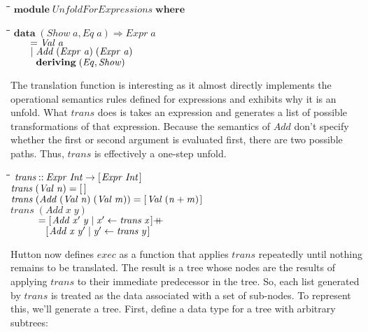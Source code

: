 \documentclass[10pt]{article}
\newlength{\lwidth}\setlength{\lwidth}{4.5cm}
\newlength{\cwidth}\setlength{\cwidth}{8mm} %
\newcommand{\Conid}[1]{\mathit{#1}}
\newcommand{\Varid}[1]{\mathit{#1}}
\newcommand{\plus}{\mathbin{+\!\!\!+}}
\begin{document}
\begin{tabbing}
\qquad\=\hspace{\lwidth}\=\hspace{\cwidth}\=\+\kill
${\mathbf{module}\;\Conid{UnfoldForExpressions}\;\mathbf{where}}$
\end{tabbing}
\begin{tabbing}
\qquad\=\hspace{\lwidth}\=\hspace{\cwidth}\=\+\kill
${\mathbf{data}\;(\Conid{Show}\;\Varid{a},\Conid{Eq}\;\Varid{a})\Rightarrow \Conid{Expr}\;\Varid{a}}$\\
${\hskip2.00em\relax\mathrel{=}\Conid{Val}\;\Varid{a}}$\\
${\hskip2.00em\relax\mid \Conid{Add}\;(\Conid{Expr}\;\Varid{a})\;(\Conid{Expr}\;\Varid{a})}$\\
${\hskip2.00em\relax\phantom{\mid \mbox{}}\mathbf{deriving}\;(\Conid{Eq},\Conid{Show})}$
\end{tabbing}
The translation function is interesting as it almost directly
implements the operational semantics rules defined for expressions and
exhibits why it is an unfold.  What \ensuremath{\Varid{trans}} does is takes an
expression and generates a list of possible transformations of that
expression.  Because the semantics of \ensuremath{\Conid{Add}} don't specify whether the
first or second argument is evaluated first, there are two possible
paths.  Thus, \ensuremath{\Varid{trans}} is effectively a one-step unfold.

\begin{tabbing}
\qquad\=\hspace{\lwidth}\=\hspace{\cwidth}\=\+\kill
${\Varid{trans}\mathbin{::}\Conid{Expr}\;\Conid{Int}\to [\mskip1.5mu \Conid{Expr}\;\Conid{Int}\mskip1.5mu]}$\\
${\Varid{trans}\;(\Conid{Val}\;\Varid{n})\mathrel{=}[\mskip1.5mu \mskip1.5mu]}$\\
${\Varid{trans}\;(\Conid{Add}\;(\Conid{Val}\;\Varid{n})\;(\Conid{Val}\;\Varid{m}))\mathrel{=}[\mskip1.5mu \Conid{Val}\;(\Varid{n}\mathbin{+}\Varid{m})\mskip1.5mu]}$\\
${\Varid{trans}\;(\Conid{Add}\;\Varid{x}\;\Varid{y})}$\\
${\phantom{\Varid{trans}\;\mbox{}}\mathrel{=}[\mskip1.5mu \Conid{Add}\;\Varid{x'}\;\Varid{y}\mid \Varid{x'}\leftarrow \Varid{trans}\;\Varid{x}\mskip1.5mu]\plus }$\\
${\phantom{\Varid{trans}\;\mbox{}}\phantom{\mathrel{=}\mbox{}}[\mskip1.5mu \Conid{Add}\;\Varid{x}\;\Varid{y'}\mid \Varid{y'}\leftarrow \Varid{trans}\;\Varid{y}\mskip1.5mu]}$
\end{tabbing}
Hutton now defines \ensuremath{\Varid{exec}} as a function that applies \ensuremath{\Varid{trans}}
repeatedly until nothing remains to be translated.  The result is a
tree whose nodes are the results of applying \ensuremath{\Varid{trans}} to their
immediate predecessor in the tree.  So, each list generated by \ensuremath{\Varid{trans}}
is treated as the data associated with a set of sub-nodes.  To
represent this, we'll generate a tree.  First, define a data type for
a tree with arbitrary subtrees:
\end{document}
